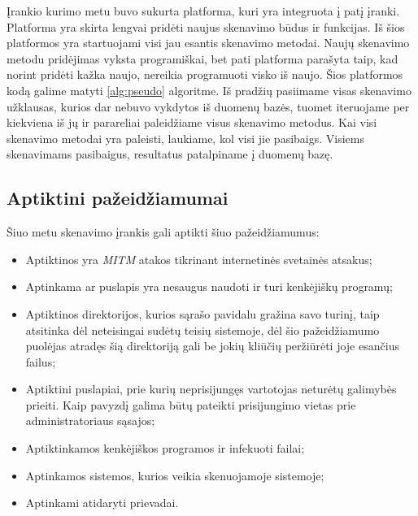 \documentclass[a4paper,12pt,fleqn]{article}
\begin{document}
Įrankio kurimo metu buvo sukurta platforma, kuri yra integruota į patį įranki. Platforma yra skirta lengvai pridėti naujus skenavimo būdus ir funkcijas. Iš šios platformos yra startuojami visi jau esantis skenavimo metodai. Naujų skenavimo metodu pridėjimas vyksta programiškai, bet pati platforma parašyta taip, kad norint pridėti kažka naujo, nereikia programuoti visko iš naujo. Šios platformos kodą galime matyti \ref{alg:pseudo} algoritme. Iš pradžių pasiimame visas skenavimo užklausas, kurios dar nebuvo vykdytos iš duomenų bazės, tuomet iteruojame per kiekviena iš jų ir parareliai paleidžiame visus skenavimo metodus. Kai visi skenavimo metodai yra paleisti, laukiame, kol visi jie pasibaigs. Visiems skenavimams pasibaigus, resultatus patalpiname į duomenų bazę.


\subsection{Aptiktini pažeidžiamumai}

Šiuo metu skenavimo įrankis gali aptikti šiuo pažeidžiamumus:
\begin{itemize}
	\item Aptiktinos yra \textit{MITM} atakos tikrinant internetinės svetainės atsakus;
	\item Aptinkama ar puslapis yra nesaugus naudoti ir turi kenkėjiškų programų;
	\item Aptiktinos direktorijos, kurios sąrašo pavidalu gražina savo turinį, taip atsitinka dėl neteisingai sudėtų teisių sistemoje, dėl šio pažeidžiamumo puolėjas atradęs šią direktoriją gali be jokių kliūčių peržiūrėti joje esančius failus;
	\item Aptiktini puslapiai, prie kurių neprisijungęs vartotojas neturėtų galimybės prieiti. Kaip pavyzdį galima būtų pateikti prisijungimo vietas prie administratoriaus sąsajos;
	\item Aptiktinkamos kenkėjiškos programos ir infekuoti failai;
	\item Aptinkamos sistemos, kurios veikia skenuojamoje sistemoje;
	\item Aptinkami atidaryti prievadai.
\end{itemize}
\end{document}
